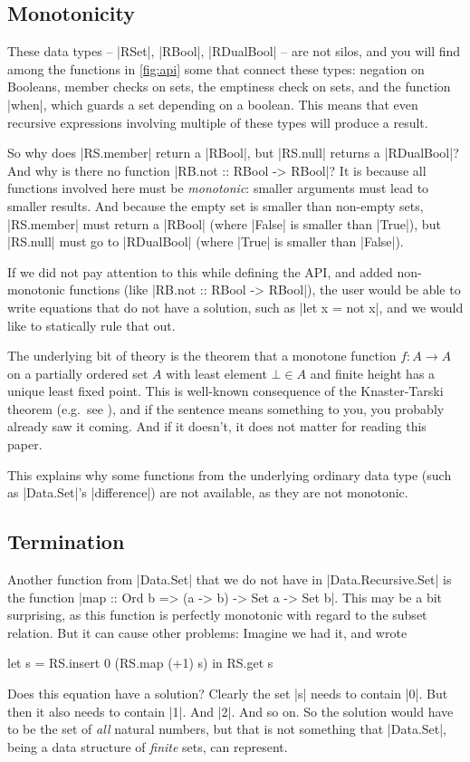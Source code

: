 \documentclass[manuscript,screen,acmsmall,nonacm]{acmart}
\begin{document}
\subsection{Monotonicity}\label{sec:monotonicity}

These data types -- |RSet|, |RBool|, |RDualBool| -- are not silos, and you will find among the functions in \cref{fig:api} some that connect these types: negation on Booleans, member checks on sets, the emptiness check on sets, and the function |when|, which guards a set depending on a boolean.
This means that even recursive expressions involving multiple of these types will produce a result.

So why does |RS.member| return a |RBool|, but |RS.null| returns a |RDualBool|? And why is there no function |RB.not :: RBool -> RBool|? It is because all functions involved here must be \emph{monotonic}: smaller arguments must lead to smaller results. And because the empty set is smaller than non-empty sets, |RS.member| must return a |RBool| (where |False| is smaller than |True|), but |RS.null| must go to |RDualBool| (where |True| is smaller than |False|).

If we did not pay attention to this while defining the API, and added non-monotonic functions (like |RB.not :: RBool -> RBool|), the user would be  able to write equations that do not have a solution, such as
|let x = not x|,
and we would like to statically rule that out.

The underlying bit of theory is the theorem that a monotone function $f : A \to A$ on a partially ordered set $A$ with least element $\bot \in A$ and finite height has a unique least fixed point. This is well-known consequence of the Knaster-Tarski theorem (e.g.\ see \citep{lazyleast}), and if the sentence means something to you, you probably already saw it coming. And if it doesn't, it does not matter for reading this paper.

This explains why some functions from the underlying ordinary data type (such as |Data.Set|'s |difference|) are not available, as they are not monotonic.

\subsection{Termination}

Another function from |Data.Set| that we do not have in |Data.Recursive.Set| is the function |map :: Ord b => (a -> b) -> Set a -> Set b|. This may be a bit surprising, as this function is perfectly monotonic with regard to the subset relation. But it can cause other problems: Imagine we had it, and wrote
\begin{code}
let s = RS.insert 0 (RS.map (+1) s) in RS.get s
\end{code}
Does this equation have a solution? Clearly the set |s| needs to contain |0|. But then it also needs to contain |1|. And |2|. And so on. So the solution would have to be the set of \emph{all} natural numbers, but that is not something that |Data.Set|, being a data structure of \emph{finite} sets, can represent.
\end{document}
